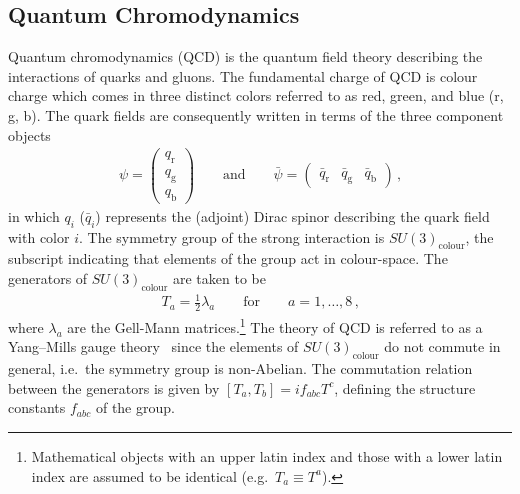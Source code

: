 

\subsection{Quantum Chromodynamics}%
\label{sec:theory_qcd}

Quantum chromodynamics (QCD) is the quantum field theory describing the
interactions of quarks and gluons. The fundamental charge of QCD is colour
charge which comes in three distinct colors referred to as red, green, and blue
(r, g, b). The quark fields are consequently written in terms of the three
component objects
\begin{align*}
  \psi =
  \begin{pmatrix}
    q_\text{r} \\
    q_\text{g} \\
    q_\text{b}
  \end{pmatrix}
  \qquad
  \text{and}
  \qquad
  \bar{\psi} =
  \begin{pmatrix}
    \bar{q}_\text{r} & \bar{q}_\text{g} & \bar{q}_\text{b}
  \end{pmatrix} \,\text{,}
\end{align*}
in which $q_i$ ($\bar{q}_i$) represents the (adjoint) Dirac spinor describing
the quark field with color $i$. The symmetry group of the strong interaction is
$SU(3)_{\text{colour}}$, the subscript indicating that elements of the group act
in colour-space. The generators of $SU(3)_{\text{colour}}$ are taken to be
\begin{align*}
  T_a = \frac{1}{2} \lambda_a \qquad \text{for} \qquad a = 1, \dots, 8 \,\text{,}
\end{align*}
where $\lambda_a$ are the Gell-Mann matrices.\footnote{Mathematical objects with
  an upper latin index and those with a lower latin index are assumed to be
  identical (e.g.\ $T_a \equiv T^a$).} The theory of QCD is referred to as a
Yang--Mills gauge theory~\cite{Yang:1954ek} since the elements of
$SU(3)_{\text{colour}}$ do not commute in general, i.e.\ the symmetry group is
non-Abelian. The commutation relation between the generators is given by
$[T_a, T_b] = i f_{abc} T^c$, defining the structure constants $f_{abc}$ of the
group.

